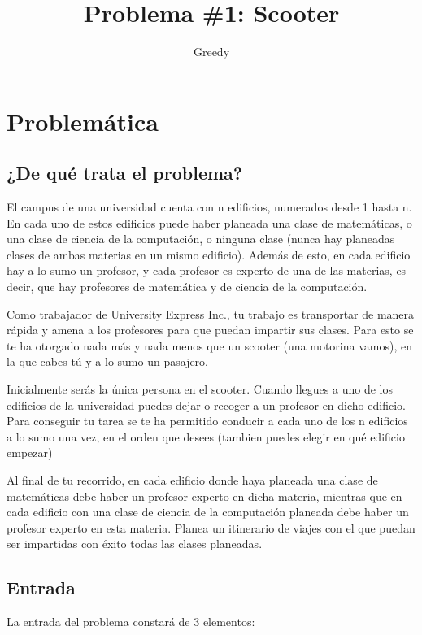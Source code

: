\documentclass[11pt]{article}
\author{
    Greedy
    }
\title{Problema \#1: Scooter}
\begin{document}
    \maketitle
    \newpage

    \section{Problemática}
    \subsection{¿De qué trata el problema?}
    El campus de una universidad cuenta con n edificios, numerados desde 1 hasta n. En cada uno de estos
    edificios puede haber planeada una clase de matemáticas, o una clase de ciencia de la computación, o ninguna clase
    (nunca hay planeadas clases de ambas materias en un mismo edificio). Además de esto, en cada edificio
    hay a lo sumo un profesor, y cada profesor es experto de una de las materias, es decir, que hay profesores
    de matemática y de ciencia de la computación.
    
    Como trabajador de University Express Inc., tu trabajo es transportar de manera rápida y amena  a los
    profesores para que puedan impartir sus clases. Para esto se te ha otorgado nada más y nada menos que un
    scooter (una motorina vamos), en la que cabes tú y a lo sumo un pasajero.
    
    Inicialmente serás la única persona en el scooter. Cuando llegues a uno de los edificios de la universidad
    puedes dejar o recoger a un profesor en dicho edificio. Para conseguir tu tarea se te ha permitido conducir
    a cada uno de los n edificios a lo sumo una vez, en el orden que desees (tambien puedes elegir en qué edificio
    empezar)

    Al final de tu recorrido, en cada edificio donde haya planeada una clase de matemáticas debe haber un
    profesor experto en dicha materia, mientras que en cada edificio con una clase de ciencia de la computación planeada
    debe haber un profesor experto en esta materia. Planea un itinerario de viajes con el que puedan ser
    impartidas con éxito todas las clases planeadas.

    \subsection{Entrada}
    La entrada del problema constará de 3 elementos:
\end{document}
